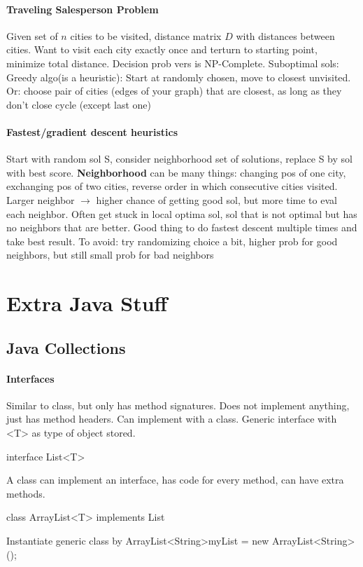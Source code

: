 \paragraph{Traveling Salesperson Problem} Given set of $n$ cities to be visited, distance matrix $D$ with distances between cities. Want to visit each city exactly once and terturn to starting point, minimize total distance. Decision prob vers is NP-Complete. Suboptimal sols: Greedy algo(is a heuristic): Start at randomly chosen, move to closest unvisited. Or: choose pair of cities (edges of your graph) that are closest, as long as they don't close cycle (except last one)
\vspace{-7 pt}
\paragraph{Fastest/gradient descent heuristics} Start with random sol S, consider neighborhood set of solutions, replace S by sol with best score. \textbf{Neighborhood} can be many things: changing pos of one city, exchanging pos of two cities, reverse order in which consecutive cities visited. Larger neighbor $\to$ higher chance of getting good sol, but more time to eval each neighbor. Often get stuck in local optima sol, sol that is not optimal but has no neighbors that are better. Good thing to do fastest descent multiple times and take best result. To avoid: try randomizing choice a bit, higher prob for good neighbors, but still small prob for bad neighbors
\color{Bittersweet}
\section{\textcolor{Bittersweet}{Extra Java Stuff}}
\subsection{Java Collections}
\paragraph{Interfaces} Similar to class, but only has method signatures. Does not implement anything, just has method headers. Can implement with a class. Generic interface with <T> as type of object stored.
\begin{algorithmic}
  \State interface List<T>{}
\end{algorithmic}
A class can implement an interface, has code for every method, can have extra methods.
\begin{algorithmic}
  \State class ArrayList<T> implements List{}
\end{algorithmic}
Instantiate generic class by ArrayList<String>myList = new ArrayList<String>();
\vspace{-7 pt}
